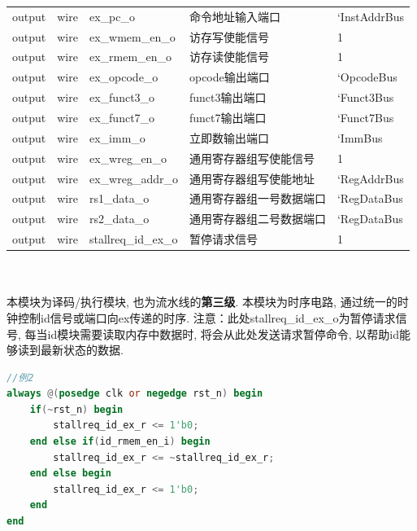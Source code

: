 \documentclass[lang=cn,11pt,a4paper,chinesefont=founder]{elegantpaper}
\begin{document}
\begin{tabular}{cclll}
    output   & wire     & ex\_pc\_o           & 命令地址输入端口           & `InstAddrBus \\
    output   & wire     & ex\_wmem\_en\_o     & 访存写使能信号             & 1            \\
    output   & wire     & ex\_rmem\_en\_o     & 访存读使能信号             & 1            \\
    output   & wire     & ex\_opcode\_o       & opcode输出端口             & `OpcodeBus   \\
    output   & wire     & ex\_funct3\_o       & funct3输出端口             & `Funct3Bus   \\
    output   & wire     & ex\_funct7\_o       & funct7输出端口             & `Funct7Bus   \\
    output   & wire     & ex\_imm\_o          & 立即数输出端口             & `ImmBus      \\
    output   & wire     & ex\_wreg\_en\_o     & 通用寄存器组写使能信号     & 1            \\
    output   & wire     & ex\_wreg\_addr\_o   & 通用寄存器组写使能地址     & `RegAddrBus  \\
    output   & wire     & rs1\_data\_o        & 通用寄存器组一号数据端口   & `RegDataBus  \\
    output   & wire     & rs2\_data\_o        & 通用寄存器组二号数据端口   & `RegDataBus  \\
    output   & wire     & stallreq\_id\_ex\_o & 暂停请求信号               & 1            \\
    \bottomrule
\end{tabular}\\
\\
本模块为译码/执行模块, 也为流水线的\textbf{第三级}. 本模块为时序电路, 通过统一的时钟控制id信号或端口向ex传递的时序. 
注意：此处stallreq\_id\_ex\_o为暂停请求信号, 每当id模块需要读取内存中数据时, 将会从此处发送请求暂停命令, 以帮助id能够读到最新状态的数据. 
\begin{lstlisting}[language=verilog]
		//例2
always @(posedge clk or negedge rst_n) begin
	if(~rst_n) begin
		stallreq_id_ex_r <= 1'b0;
	end else if(id_rmem_en_i) begin
		stallreq_id_ex_r <= ~stallreq_id_ex_r;
	end else begin
		stallreq_id_ex_r <= 1'b0;
	end
end
	\end{lstlisting}
\end{document}
